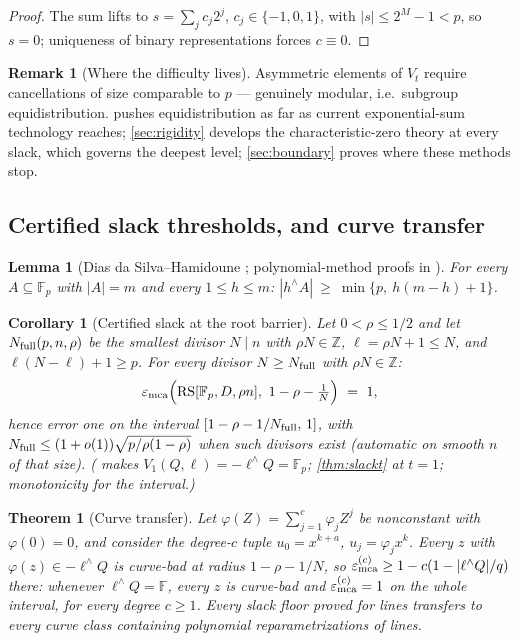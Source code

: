 \documentclass[11pt]{article}
\newtheorem{theorem}{Theorem}[section]
\newtheorem{lemma}[lemma]{Lemma}
\newtheorem{corollary}[corollary]{Corollary}
\theoremstyle{definition}
\newtheorem{remark}[remark]{Remark}
\newcommand{\F}{\mathbb F}
\newcommand{\Z}{\mathbb Z}
\newcommand{\eps}{\varepsilon}
\newcommand{\RS}{\mathrm{RS}}
\newcommand{\emca}{\eps_{\rm mca}}
\begin{document}
\begin{proof}
The sum lifts to $s=\sum_jc_j2^j$, $c_j\in\{-1,0,1\}$, with $|s|\le2^M-1<p$, so $s=0$; uniqueness of binary representations forces $c\equiv0$.
\end{proof}

\begin{remark}[Where the difficulty lives]\label{rem:wall}
Asymmetric elements of $V_t$ require cancellations of size comparable to $p$ --- genuinely modular, i.e.\ subgroup equidistribution.   pushes equidistribution as far as current exponential-sum technology reaches; \cref{sec:rigidity} develops the characteristic-zero theory at every slack, which governs the deepest level; \cref{sec:boundary} proves where these methods stop.
\end{remark}

\subsection{Certified slack thresholds, and curve transfer}

\begin{lemma}[Dias da Silva--Hamidoune \cite{DH94}; polynomial-method proofs in \cite{ANR96,Alon99}]\label{lem:dsh}
For every $A\subseteq\F_p$ with $|A|=m$ and every $1\le h\le m$:
$|h^{\wedge}A|\ \ge\ \min\{p,\ h(m-h)+1\}$.
\end{lemma}

\begin{corollary}[Certified slack at the root barrier]\label{cor:certified}
Let $0<\rho\le1/2$ and let $N_{\rm full}(p,n,\rho)$ be the smallest divisor $N\mid n$ with $\rho N\in\Z$, $\ell=\rho N+1\le N$, and $\ell(N-\ell)+1\ge p$.  For every divisor $N\ge N_{\rm full}$ with $\rho N\in\Z$:
\[
        \emca\Big(\RS[\F_p,D,\rho n],\ 1-\rho-\tfrac1N\Big)\ =\ 1,
\]
hence error one on the interval $[1-\rho-1/N_{\rm full},\,1]$, with $N_{\rm full}\le(1+o(1))\sqrt{p/\rho(1-\rho)}$ when such divisors exist (automatic on smooth $n$ of that size).  ( makes $V_1(Q,\ell)=-\ell^{\wedge}Q=\F_p$; \cref{thm:slackt} at $t=1$; monotonicity for the interval.)
\end{corollary}

\begin{theorem}[Curve transfer]\label{thm:curve}
Let $\varphi(Z)=\sum_{j=1}^c\varphi_jZ^j$ be nonconstant with $\varphi(0)=0$, and consider the degree-$c$ tuple $u_0=x^{k+a}$, $u_j=\varphi_jx^k$.  Every $z$ with $\varphi(z)\in-\ell^{\wedge}Q$ is curve-bad at radius $1-\rho-1/N$, so
$\eps^{(c)}_{\rm mca}\ge1-c(1-|\ell^{\wedge}Q|/q)$ there: whenever $\ell^{\wedge}Q=\F$, \emph{every} $z$ is curve-bad and $\eps^{(c)}_{\rm mca}=1$ on the whole interval, for every degree $c\ge1$.  Every slack floor proved for lines transfers to every curve class containing polynomial reparametrizations of lines.
\end{theorem}
\end{document}
